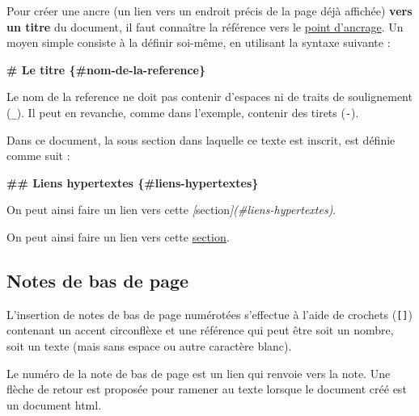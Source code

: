 \documentclass[
  11pt,
]{book}
\newenvironment{Shaded}{\begin{snugshade}}{\end{snugshade}}
\newcommand{\CommentTok}[1]{\textcolor[rgb]{0.56,0.35,0.01}{\textit{#1}}}
\newcommand{\FunctionTok}[1]{\textcolor[rgb]{0.13,0.29,0.53}{\textbf{#1}}}
\newcommand{\NormalTok}[1]{#1}
\newcommand{\OtherTok}[1]{\textcolor[rgb]{0.56,0.35,0.01}{#1}}
\numberwithin{equation}{section}
\numberwithin{countremarque}{section}
\begin{document}
Pour créer une ancre (un lien vers un endroit précis de la page déjà affichée) \textbf{vers un titre} du document, il faut connaître la référence vers le \protect\hyperlink{lien-ancre}{point d'ancrage}. Un moyen simple consiste à la définir soi-même, en utilisant la syntaxe suivante :

\begin{Shaded}
\begin{Highlighting}[]
\FunctionTok{\# Le titre \{\#nom{-}de{-}la{-}reference\}}
\end{Highlighting}
\end{Shaded}

Le nom de la reference ne doit pas contenir d'espaces ni de traits de soulignement (\texttt{\_}). Il peut en revanche, comme dans l'exemple, contenir des tirets (\texttt{-}).

Dans ce document, la sous section dans laquelle ce texte est inscrit, est définie comme suit :

\begin{Shaded}
\begin{Highlighting}[]
\FunctionTok{\#\# Liens hypertextes \{\#liens{-}hypertextes\}}
\end{Highlighting}
\end{Shaded}

\begin{Shaded}
\begin{Highlighting}[]
\NormalTok{On peut ainsi faire un lien vers cette }\CommentTok{[}\OtherTok{section}\CommentTok{](\#liens{-}hypertextes)}\NormalTok{.}
\end{Highlighting}
\end{Shaded}

On peut ainsi faire un lien vers cette \protect\hyperlink{liens-hypertextes}{section}.

\hypertarget{notes-de-bas-de-page}{%
\subsection{Notes de bas de page}\label{notes-de-bas-de-page}}

L'insertion de notes de bas de page numérotées s'effectue à l'aide de crochets (\texttt{{[}{]}}) contenant un accent circonflèxe et une référence qui peut être soit un nombre, soit un texte (mais sans espace ou autre caractère blanc).

Le numéro de la note de bas de page est un lien qui renvoie vers la note. Une flèche de retour est proposée pour ramener au texte lorsque le document créé est un document html.
\end{document}
